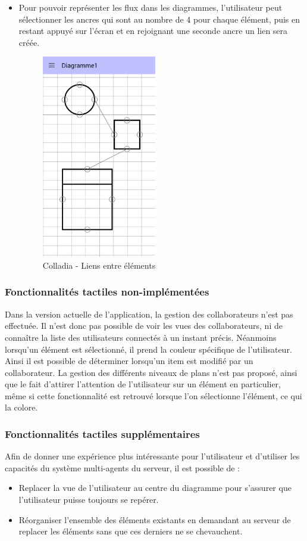 \begin{itemize}
\item Pour pouvoir représenter les flux dans les diagrammes, l'utilisateur peut sélectionner les ancres qui sont au nombre de 4 pour chaque élément, puis en restant appuyé sur l'écran et en rejoignant une seconde ancre un lien sera créée.
		\begin{figure}[!h]
			\centering
			\includegraphics[width=5cm]{img/screen/new/colladia_draw_view_element_links}
			\caption{Colladia - Liens entre éléments}
		\end{figure}
\end{itemize}
	
\subsubsection{Fonctionnalités tactiles non-implémentées}

Dans la version actuelle de l'application, la gestion des collaborateurs n'est pas effectuée. Il n'est donc pas possible de voir les vues des collaborateurs, ni de connaître la liste des utilisateurs connectés à un instant précis. Néanmoins lorsqu'un élément est sélectionné, il prend la couleur spécifique de l'utilisateur. Ainsi il est possible de déterminer lorsqu'un item est modifié par un collaborateur. 
La gestion des différents niveaux de plans n'est pas proposé, ainsi que le fait d'attirer l'attention de l'utilisateur sur un élément en particulier, même si cette fonctionnalité est retrouvé lorsque l'on sélectionne l'élément, ce qui la colore. 

\subsubsection{Fonctionnalités tactiles supplémentaires}
Afin de donner une expérience plus intéressante pour l'utilisateur et d'utiliser les capacités du système multi-agents du serveur, il est possible de :
\begin{itemize}
	\item Replacer la vue de l'utilisateur au centre du diagramme pour s'assurer que l'utilisateur puisse toujours se repérer.
	\item Réorganiser l'ensemble des éléments existants en demandant au serveur de replacer les éléments sans que ces derniers ne se chevauchent.
\end{itemize}

